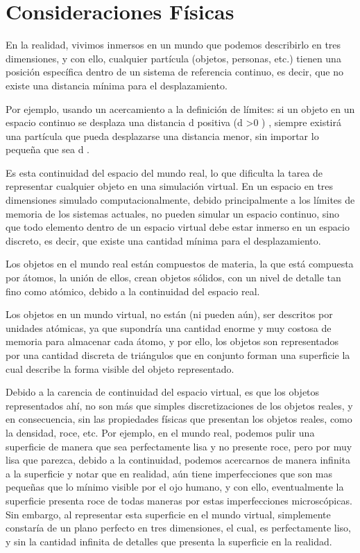 \section{Consideraciones Físicas}
\label{sec:consideracionesFisicas}
En la realidad, vivimos inmersos en un mundo que podemos describirlo en tres 
dimensiones, y con ello, cualquier partícula (objetos, personas, etc.) tienen una posición 
específica dentro de un sistema de referencia continuo, es decir, que no existe una distancia 
mínima para el desplazamiento.

Por ejemplo, usando un acercamiento a la definición de límites: si un objeto en un espacio 
continuo se desplaza una distancia  d  positiva  (d >0 ) , siempre existirá una partícula que 
pueda desplazarse una distancia menor, sin importar lo pequeña que sea  d .

Es esta continuidad del espacio del mundo real, lo que dificulta la tarea de representar 
cualquier objeto en una simulación virtual.
En un espacio en tres dimensiones simulado computacionalmente, debido principalmente 
a los límites de memoria de los sistemas actuales, no pueden simular un espacio continuo, sino 
que todo elemento dentro de un espacio virtual debe estar inmerso en un espacio discreto, es 
decir, que existe una cantidad mínima para el desplazamiento.

Los objetos en el mundo real están compuestos de materia, la que está compuesta por 
átomos, la unión de ellos, crean objetos sólidos, con un nivel de detalle tan fino como atómico, 
debido a la continuidad del espacio real.

Los objetos en un mundo virtual, no están (ni pueden aún), ser descritos por unidades 
atómicas, ya que supondría una cantidad enorme y muy costosa de memoria para almacenar cada 
átomo, y por ello, los objetos son representados por una cantidad discreta de triángulos que en 
conjunto forman una superficie la cual describe la forma visible del objeto representado.

Debido a la carencia de continuidad del espacio virtual, es que los objetos representados 
ahí, no son más que simples discretizaciones de los objetos reales, y en consecuencia, sin las 
propiedades físicas que presentan los objetos reales, como la densidad, roce, etc.
Por ejemplo, en el mundo real, podemos pulir una superficie de manera que sea 
perfectamente lisa y no presente roce, pero por muy lisa que parezca, debido a la continuidad, 
podemos acercarnos de manera infinita a la superficie y notar que en realidad, aún tiene 
imperfecciones que son mas pequeñas que lo mínimo visible por el ojo humano, y con ello, 
eventualmente la superficie presenta roce de todas maneras por estas imperfecciones 
microscópicas. Sin embargo, al representar esta superficie en el mundo virtual, simplemente 
constaría de un plano perfecto en tres dimensiones, el cual, es perfectamente liso, y sin la 
cantidad infinita de detalles que presenta la superficie en la realidad.

